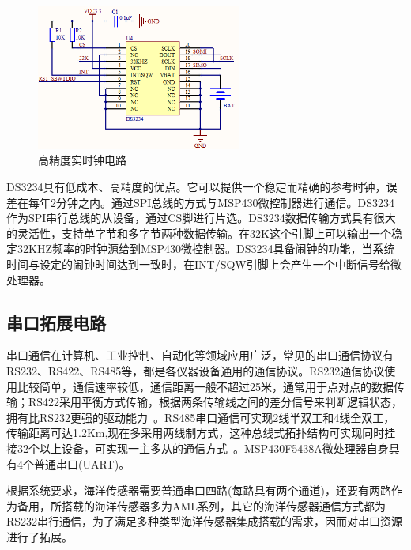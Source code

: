 \begin{figure}[ht]
    \centering
	\includegraphics[width=0.6\textwidth]{fig/高精度实时钟模块电路.png}
	\caption{高精度实时钟电路}
	\label{fig:高精度实时钟电路}
\end{figure}

DS3234具有低成本、高精度的优点。它可以提供一个稳定而精确的参考时钟，误差在每年2分钟之内。通过SPI总线的方式与MSP430微控制器进行通信。DS3234作为SPI串行总线的从设备，通过CS脚进行片选。DS3234数据传输方式具有很大的灵活性，支持单字节和多字节两种数据传输。在32K这个引脚上可以输出一个稳定32KHZ频率的时钟源给到MSP430微控制器。DS3234具备闹钟的功能，当系统时间与设定的闹钟时间达到一致时，在INT/SQW引脚上会产生一个中断信号给微处理器。

\subsection{串口拓展电路}
串口通信在计算机、工业控制、自动化等领域应用广泛，常见的串口通信协议有RS232、RS422、RS485等，都是各仪器设备通用的通信协议。RS232通信协议使用比较简单，通信速率较低，通信距离一般不超过25米，通常用于点对点的数据传输；RS422采用平衡方式传输，根据两条传输线之间的差分信号来判断逻辑状态，拥有比RS232更强的驱动能力~\cite{2020wqh}。RS485串口通信可实现2线半双工和4线全双工，传输距离可达1.2Km,现在多采用两线制方式，这种总线式拓扑结构可实现同时挂接32个以上设备，可实现一主多从的通信方式~\cite{2016cmy}。MSP430F5438A微处理器自身具有4个普通串口(UART)。

根据系统要求，海洋传感器需要普通串口四路(每路具有两个通道)，还要有两路作为备用，所搭载的海洋传感器多为AML系列，其它的海洋传感器通信方式都为RS232串行通信，为了满足多种类型海洋传感器集成搭载的需求，因而对串口资源进行了拓展。

